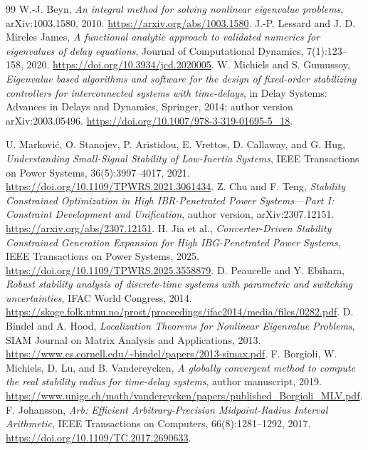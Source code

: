 \documentclass[11pt]{article}
\begin{document}
\begin{thebibliography}{99}
 W.-J. Beyn,
\emph{An integral method for solving nonlinear eigenvalue problems},
arXiv:1003.1580, 2010.
\url{https://arxiv.org/abs/1003.1580}.
 J.-P. Lessard and J. D. Mireles James,
\emph{A functional analytic approach to validated numerics for
eigenvalues of delay equations}, Journal of Computational Dynamics,
7(1):123--158, 2020.
\url{https://doi.org/10.3934/jcd.2020005}.
 W. Michiels and S. Gumussoy,
\emph{Eigenvalue based algorithms and software for the design of
fixed-order stabilizing controllers for interconnected systems with
time-delays}, in Delay Systems: Advances in Delays and Dynamics,
Springer, 2014; author version arXiv:2003.05496.
\url{https://doi.org/10.1007/978-3-319-01695-5_18}.

 U. Markovi\'c, O. Stanojev, P. Aristidou,
E. Vrettos, D. Callaway, and G. Hug,
\emph{Understanding Small-Signal Stability of Low-Inertia Systems},
IEEE Transactions on Power Systems, 36(5):3997--4017, 2021.
\url{https://doi.org/10.1109/TPWRS.2021.3061434}.
 Z. Chu and F. Teng,
\emph{Stability Constrained Optimization in High IBR-Penetrated
Power Systems---Part I: Constraint Development and Unification},
author version, arXiv:2307.12151.
\url{https://arxiv.org/abs/2307.12151}.
 H. Jia et al.,
\emph{Converter-Driven Stability Constrained Generation Expansion
for High IBG-Penetrated Power Systems},
IEEE Transactions on Power Systems, 2025.
\url{https://doi.org/10.1109/TPWRS.2025.3558879}.
 D. Peaucelle and Y. Ebihara,
\emph{Robust stability analysis of discrete-time systems with
parametric and switching uncertainties}, IFAC World Congress, 2014.
\url{https://skoge.folk.ntnu.no/prost/proceedings/ifac2014/media/files/0282.pdf}.
 D. Bindel and A. Hood,
\emph{Localization Theorems for Nonlinear Eigenvalue Problems},
SIAM Journal on Matrix Analysis and Applications, 2013.
\url{https://www.cs.cornell.edu/~bindel/papers/2013-simax.pdf}.
 F. Borgioli, W. Michiels, D. Lu, and B. Vandereycken,
\emph{A globally convergent method to compute the real stability
radius for time-delay systems}, author manuscript, 2019.
\url{https://www.unige.ch/math/vandereycken/papers/published_Borgioli_MLV.pdf}.
 F. Johansson,
\emph{Arb: Efficient Arbitrary-Precision Midpoint-Radius Interval
Arithmetic}, IEEE Transactions on Computers, 66(8):1281--1292, 2017.
\url{https://doi.org/10.1109/TC.2017.2690633}.
\end{thebibliography}
\end{document}
